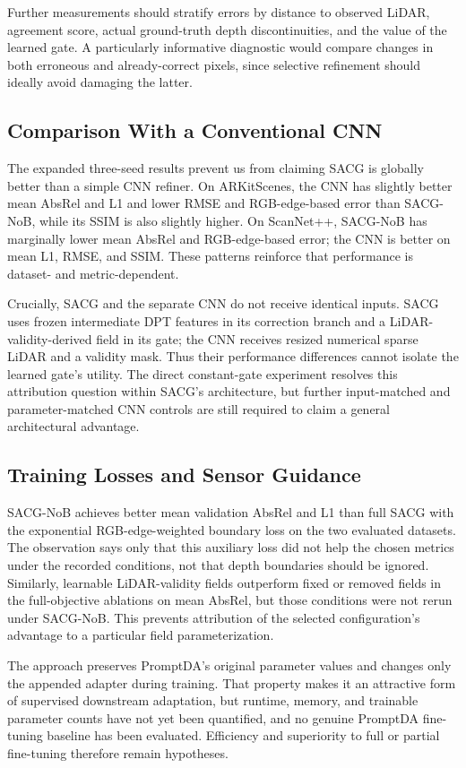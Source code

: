 Further measurements should stratify errors by distance to observed LiDAR, agreement score, actual ground-truth depth discontinuities, and the value of the learned gate. A particularly informative diagnostic would compare changes in both erroneous and already-correct pixels, since selective refinement should ideally avoid damaging the latter.

\subsection{Comparison With a Conventional CNN}
The expanded three-seed results prevent us from claiming SACG is globally better than a simple CNN refiner. On ARKitScenes, the CNN has slightly better mean AbsRel and L1 and lower RMSE and RGB-edge-based error than SACG-NoB, while its SSIM is also slightly higher. On ScanNet++, SACG-NoB has marginally lower mean AbsRel and RGB-edge-based error; the CNN is better on mean L1, RMSE, and SSIM. These patterns reinforce that performance is dataset- and metric-dependent.

Crucially, SACG and the separate CNN do not receive identical inputs. SACG uses frozen intermediate DPT features in its correction branch and a LiDAR-validity-derived field in its gate; the CNN receives resized numerical sparse LiDAR and a validity mask. Thus their performance differences cannot isolate the learned gate's utility. The direct constant-gate experiment resolves this attribution question within SACG's architecture, but further input-matched and parameter-matched CNN controls are still required to claim a general architectural advantage.

\subsection{Training Losses and Sensor Guidance}
SACG-NoB achieves better mean validation AbsRel and L1 than full SACG with the exponential RGB-edge-weighted boundary loss on the two evaluated datasets. The observation says only that this auxiliary loss did not help the chosen metrics under the recorded conditions, not that depth boundaries should be ignored. Similarly, learnable LiDAR-validity fields outperform fixed or removed fields in the full-objective ablations on mean AbsRel, but those conditions were not rerun under SACG-NoB. This prevents attribution of the selected configuration's advantage to a particular field parameterization.

The approach preserves PromptDA's original parameter values and changes only the appended adapter during training. That property makes it an attractive form of supervised downstream adaptation, but runtime, memory, and trainable parameter counts have not yet been quantified, and no genuine PromptDA fine-tuning baseline has been evaluated. Efficiency and superiority to full or partial fine-tuning therefore remain hypotheses.


